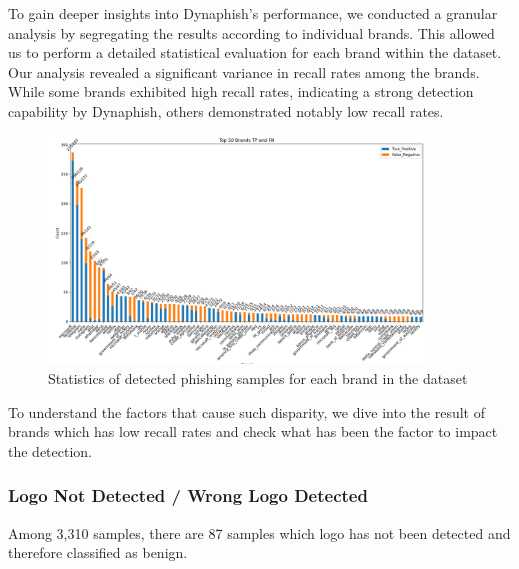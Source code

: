 

To gain deeper insights into Dynaphish's performance, we conducted a granular analysis by segregating the results according to individual brands. This allowed us to perform a detailed statistical evaluation for each brand within the dataset. Our analysis revealed a significant variance in recall rates among the brands. While some brands exhibited high recall rates, indicating a strong detection capability by Dynaphish, others demonstrated notably low recall rates. 

\begin{figure}[H]
\caption{Statistics of detected phishing samples for each brand in the dataset}
\centering
\includegraphics[width=0.9\textwidth]{images/stat_3k_phishing.png}
\end{figure}

To understand the factors that cause such disparity, we dive into the result of brands which has low recall rates and check what has been the factor to impact the detection. 

\subsubsection{Logo Not Detected / Wrong Logo Detected}

Among 3,310 samples, there are 87 samples which logo has not been detected and therefore classified as benign. 

